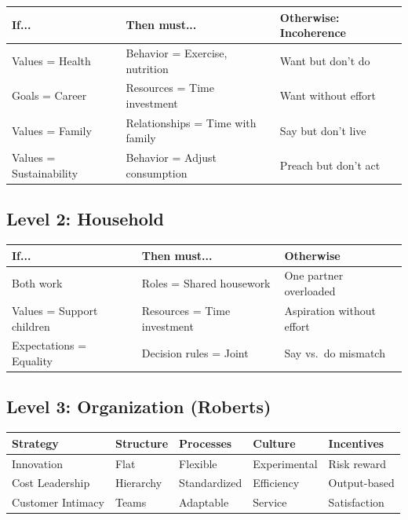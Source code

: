 \documentclass[12pt,a4paper]{article}
\begin{document}
\begin{center}
\renewcommand{\arraystretch}{1.2}
\begin{tabular}{lll}
\hline
\textbf{If...} & \textbf{Then must...} & \textbf{Otherwise: Incoherence} \\
\hline
Values = Health & Behavior = Exercise, nutrition & Want but don't do \\
Goals = Career & Resources = Time investment & Want without effort \\
Values = Family & Relationships = Time with family & Say but don't live \\
Values = Sustainability & Behavior = Adjust consumption & Preach but don't act \\
\hline
\end{tabular}
\end{center}

\subsection{Level 2: Household}

\begin{center}
\renewcommand{\arraystretch}{1.2}
\begin{tabular}{lll}
\hline
\textbf{If...} & \textbf{Then must...} & \textbf{Otherwise} \\
\hline
Both work & Roles = Shared housework & One partner overloaded \\
Values = Support children & Resources = Time investment & Aspiration without effort \\
Expectations = Equality & Decision rules = Joint & Say vs.\ do mismatch \\
\hline
\end{tabular}
\end{center}

\subsection{Level 3: Organization (Roberts)}

\begin{center}
\renewcommand{\arraystretch}{1.1}
\begin{tabular}{lllll}
\hline
\textbf{Strategy} & \textbf{Structure} & \textbf{Processes} & \textbf{Culture} & \textbf{Incentives} \\
\hline
Innovation & Flat & Flexible & Experimental & Risk reward \\
Cost Leadership & Hierarchy & Standardized & Efficiency & Output-based \\
Customer Intimacy & Teams & Adaptable & Service & Satisfaction \\
\hline
\end{tabular}
\end{center}
\end{document}
